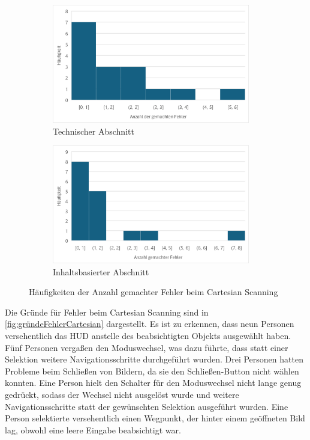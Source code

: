 \begin{figure}
    \centering
    \begin{subfigure}{.5\textwidth}
        \centering
        \includegraphics[width=0.95\textwidth]{images/Results/Histogramm-Anzahl-Fehler-technisch-cartesian.png}
        \caption{Technischer Abschnitt}
        \label{fig:anzahlFehlerCartesianTechnisch}
    \end{subfigure}%
    \begin{subfigure}{.5\textwidth}
        \centering
        \includegraphics[width=0.95\textwidth]{images/Results/Histogramm-Anzahl-Fehler-inhalt-cartesian.png}
        \caption{Inhaltsbasierter Abschnitt}
        \label{fig:anzahlFehlerCartesianInhalt}
    \end{subfigure}
    \caption{Häufigkeiten der Anzahl gemachter Fehler beim Cartesian Scanning}
    \label{fig:anzahlFehlerCartesian}
\end{figure}

Die Gründe für Fehler beim Cartesian Scanning sind in \autoref{fig:gründeFehlerCartesian} dargestellt. Es ist zu erkennen, dass neun Personen versehentlich das HUD anstelle des beabsichtigten Objekts ausgewählt haben. Fünf Personen vergaßen den Moduswechsel, was dazu führte, dass statt einer Selektion weitere Navigationsschritte durchgeführt wurden. Drei Personen hatten Probleme beim Schließen von Bildern, da sie den Schließen-Button nicht wählen konnten. Eine Person hielt den Schalter für den Moduswechsel nicht lange genug gedrückt, sodass der Wechsel nicht ausgelöst wurde und weitere Navigationsschritte statt der gewünschten Selektion ausgeführt wurden. Eine Person selektierte versehentlich einen Wegpunkt, der hinter einem geöffneten Bild lag, obwohl eine leere Eingabe beabsichtigt war. 


